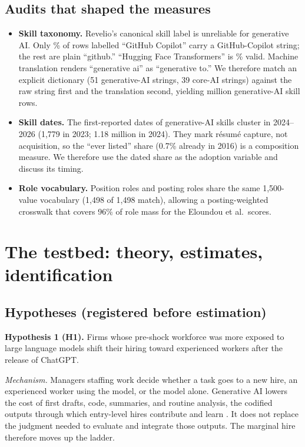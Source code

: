 \documentclass[11pt]{article}
\theoremstyle{remark}\newtheorem{remark}{Remark}
\begin{document}
\subsection{Audits that shaped the measures}
\begin{itemize}
\item \textbf{Skill taxonomy.} Revelio's canonical skill label is unreliable for generative AI. Only \GitHubValid\% of rows
labelled ``GitHub Copilot'' carry a GitHub-Copilot string; the rest are plain ``github.'' ``Hugging Face Transformers'' is
\HFValid\% valid. Machine translation renders ``generative ai'' as ``generative to.'' We therefore match an explicit
dictionary (51 generative-AI strings, 39 core-AI strings) against the raw string first and the translation second,
yielding \GenAIrows million generative-AI skill rows.
\item \textbf{Skill dates.} The first-reported dates of generative-AI skills cluster in 2024--2026 (1,779 in 2023; 1.18
million in 2024). They mark r\'esum\'e capture, not acquisition, so the ``ever listed'' share (0.7\% already in 2016) is a
composition measure. We therefore use the dated share as the adoption variable and discuss its timing.
\item \textbf{Role vocabulary.} Position roles and posting roles share the same 1,500-value vocabulary (1,498 of 1,498
match), allowing a posting-weighted crosswalk that covers 96\% of role mass for the Eloundou et al.\ scores.
\end{itemize}




\section{The testbed: theory, estimates, identification}\label{sec:testbed}

\subsection{Hypotheses (registered before estimation)}

\textbf{Hypothesis 1 (H1).} Firms whose pre-shock workforce was more exposed to large language models shift their hiring
toward experienced workers after the release of ChatGPT.

\emph{Mechanism.} Managers staffing work decide whether a task goes to a new hire, an experienced worker using the model, or
the model alone. Generative AI lowers the cost of first drafts, code, summaries, and routine analysis, the codified outputs
through which entry-level hires contribute and learn \citep{march1991exploration,levinthal1993myopia}. It does not replace
the judgment needed to evaluate and integrate those outputs. The marginal hire therefore moves up the ladder.
\end{document}
